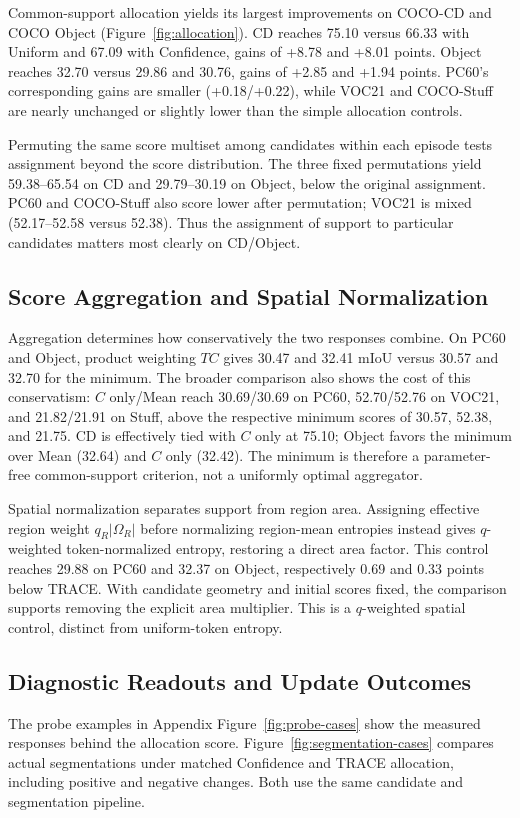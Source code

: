 \documentclass[letterpaper]{article}
\begin{document}
Common-support allocation yields its largest improvements on COCO-CD and COCO Object (Figure~\ref{fig:allocation}). CD reaches 75.10 versus 66.33 with Uniform and 67.09 with Confidence, gains of +8.78 and +8.01 points. Object reaches 32.70 versus 29.86 and 30.76, gains of +2.85 and +1.94 points. PC60's corresponding gains are smaller (+0.18/+0.22), while VOC21 and COCO-Stuff are nearly unchanged or slightly lower than the simple allocation controls.

Permuting the same score multiset among candidates within each episode tests assignment beyond the score distribution. The three fixed permutations yield 59.38--65.54 on CD and 29.79--30.19 on Object, below the original assignment. PC60 and COCO-Stuff also score lower after permutation; VOC21 is mixed (52.17--52.58 versus 52.38). Thus the assignment of support to particular candidates matters most clearly on CD/Object.

\subsection{Score Aggregation and Spatial Normalization}
Aggregation determines how conservatively the two responses combine. On PC60 and Object, product weighting $TC$ gives 30.47 and 32.41 mIoU versus 30.57 and 32.70 for the minimum. The broader comparison also shows the cost of this conservatism: $C$ only/Mean reach 30.69/30.69 on PC60, 52.70/52.76 on VOC21, and 21.82/21.91 on Stuff, above the respective minimum scores of 30.57, 52.38, and 21.75. CD is effectively tied with $C$ only at 75.10; Object favors the minimum over Mean (32.64) and $C$ only (32.42). The minimum is therefore a parameter-free common-support criterion, not a uniformly optimal aggregator.

Spatial normalization separates support from region area. Assigning effective region weight $q_R|\Omega_R|$ before normalizing region-mean entropies instead gives $q$-weighted token-normalized entropy, restoring a direct area factor. This control reaches 29.88 on PC60 and 32.37 on Object, respectively 0.69 and 0.33 points below TRACE. With candidate geometry and initial scores fixed, the comparison supports removing the explicit area multiplier. This is a $q$-weighted spatial control, distinct from uniform-token entropy.

\subsection{Diagnostic Readouts and Update Outcomes}
The probe examples in Appendix Figure~\ref{fig:probe-cases} show the measured responses behind the allocation score. Figure~\ref{fig:segmentation-cases} compares actual segmentations under matched Confidence and TRACE allocation, including positive and negative changes. Both use the same candidate and segmentation pipeline.
\end{document}
